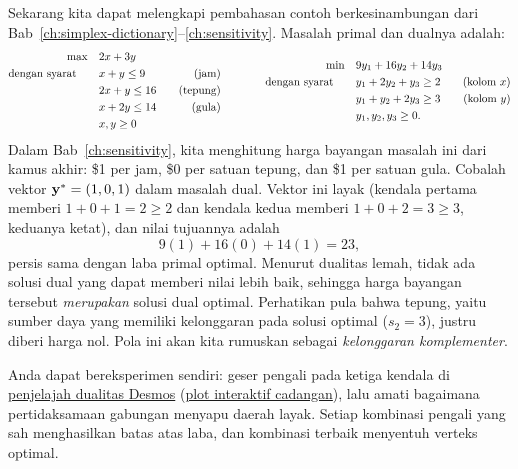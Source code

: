 Sekarang kita dapat melengkapi pembahasan contoh berkesinambungan dari Bab~\ref{ch:simplex-dictionary}--\ref{ch:sensitivity}. Masalah primal dan dualnya adalah:
\[
\begin{aligned}
\max \quad & 2x + 3y \\
\mbox{dengan syarat}\quad \quad
& x + y \leq 9 \quad & \mbox{(jam)} \\
& 2x + y \leq 16 \quad & \mbox{(tepung)} \\
& x + 2y \leq 14 \quad & \mbox{(gula)} \\
& x, y \geq 0
\end{aligned}
\qquad\qquad
\begin{aligned}
\min \quad & 9y_1 + 16y_2 + 14y_3 \\
\mbox{dengan syarat}\quad \quad
& y_1 + 2y_2 + y_3 \geq 2 \quad & \mbox{(kolom $x$)} \\
& y_1 + y_2 + 2y_3 \geq 3 \quad & \mbox{(kolom $y$)} \\
& y_1, y_2, y_3 \geq 0.
\end{aligned}
\]
Dalam Bab~\ref{ch:sensitivity}, kita menghitung harga bayangan masalah ini dari kamus akhir: \$1 per jam, \$0 per satuan tepung, dan \$1 per satuan gula. Cobalah vektor $\mathbf{y}^* = (1, 0, 1)$ dalam masalah dual. Vektor ini layak (kendala pertama memberi $1 + 0 + 1 = 2 \geq 2$ dan kendala kedua memberi $1 + 0 + 2 = 3 \geq 3$, keduanya ketat), dan nilai tujuannya adalah
\[
9(1) + 16(0) + 14(1) = 23,
\]
persis sama dengan laba primal optimal. Menurut dualitas lemah, tidak ada solusi dual yang dapat memberi nilai lebih baik, sehingga harga bayangan tersebut \emph{merupakan} solusi dual optimal. Perhatikan pula bahwa tepung, yaitu sumber daya yang memiliki kelonggaran pada solusi optimal ($s_2 = 3$), justru diberi harga nol. Pola ini akan kita rumuskan sebagai \emph{kelonggaran komplementer}.

Anda dapat bereksperimen sendiri: geser pengali pada ketiga kendala di \href{https://www.desmos.com/calculator/d2d5c861c3}{penjelajah dualitas Desmos} (\href{https://open-optimization.github.io/open-optimization-or-book/interactive-figures/lp-duality-explorer.html}{plot interaktif cadangan}), lalu amati bagaimana pertidaksamaan gabungan menyapu daerah layak. Setiap kombinasi pengali yang sah menghasilkan batas atas laba, dan kombinasi terbaik menyentuh verteks optimal.


